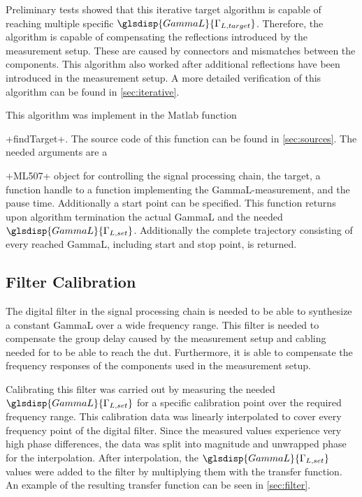 \documentclass[12pt,a4paper,parskip=full,abstract=true,BCOR=12mm,twoside,open=right]{scrreprt}
\newcommand*{\SavedLstInline}{}
\DeclareRobustCommand*{\lstinline}{%
  \ifmmode
    \let\SavedBGroup\bgroup
    \def\bgroup{%
      \let\bgroup\SavedBGroup
      \hbox\bgroup
    }%
  \fi
  \SavedLstInline
}
\begin{document}
Preliminary tests showed that this iterative target algorithm is capable
of reaching multiple specific $\glsdisp{GammaL}{\Gamma_{L,target}}$. Therefore,
the algorithm is capable of compensating the reflections introduced by
the measurement setup. These are caused by connectors and mismatches between
the components. This algorithm also
worked after additional reflections have been introduced in the
measurement setup. A more detailed verification of this algorithm can be found
in \cref{sec:iterative}.

This algorithm was implement in the Matlab function \lstinline+findTarget+.
The source code of this function can be found in \cref{sec:sources}. The needed
arguments are a \lstinline+ML507+ object for controlling the signal processing
chain, the target, a function handle to a function implementing the
\gls{GammaL}-measurement, and the pause time. Additionally a start point
can be specified. This function returns upon algorithm termination the actual
\gls{GammaL} and the needed $\glsdisp{GammaL}{\Gamma_{L,set}}$. Additionally the complete
trajectory consisting of every reached \gls{GammaL}, including start and stop point,
is returned.


\subsection{Filter Calibration}
\label{sec:filtercal}

The digital filter in the signal processing chain is needed to be able to
synthesize a constant \gls{GammaL} over a wide frequency range. This
filter is needed to compensate the group delay caused by the measurement
setup and cabling needed for to be able to reach the \gls{dut}. Furthermore,
it is able to compensate the frequency responses of the components used
in the measurement setup.

Calibrating this filter was carried out by measuring the needed
$\glsdisp{GammaL}{\Gamma_{L,set}}$ for a specific calibration point over
the required frequency range. This calibration data was linearly interpolated to
cover every frequency point of the digital filter. Since the measured values
experience very high phase differences, the data was split into magnitude and
unwrapped phase for the interpolation. After interpolation, the
$\glsdisp{GammaL}{\Gamma_{L,set}}$ values were added to the filter by multiplying
them with the transfer function. An example of the resulting transfer function
can be seen in \cref{sec:filter}.
\end{document}
